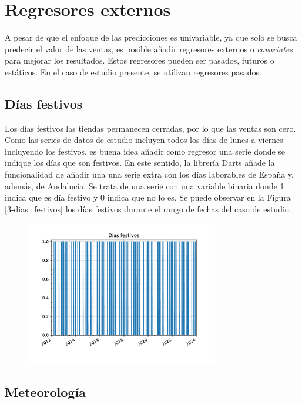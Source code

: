 \section{Regresores externos}

A pesar de que el enfoque de las predicciones es univariable, ya que solo se busca predecir el valor de las ventas, es posible añadir regresores externos o \textit{covariates} para mejorar los resultados. Estos regresores pueden ser pasados, futuros o estáticos. En el caso de estudio presente, se utilizan regresores pasados.

\subsection{Días festivos}

Los días festivos las tiendas permanecen cerradas, por lo que las ventas son cero. Como las series de datos de estudio incluyen todos los días de lunes a viernes incluyendo los festivos, es buena idea añadir como regresor una serie donde se indique los días que son festivos. En este sentido, la librería Darts añade la funcionalidad de añadir una una serie extra con los días laborables de España y, además, de Andalucía. Se trata de una serie con una variable binaria donde 1 indica que es día festivo y 0 indica que no lo es. Se puede observar en la Figura \ref*{3-dias_festivos} los días festivos durante el rango de fechas del caso de estudio.

\begin{figure}[H]
	{\includegraphics[width=0.75\textwidth]{imagenes/grafica_holidays.pdf}}
\end{figure}

\subsection{Meteorología}

